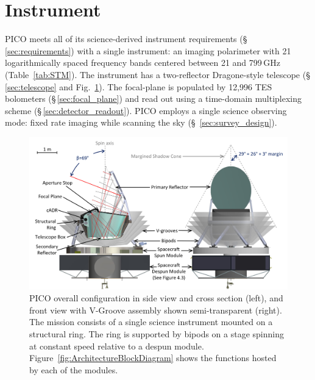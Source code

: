 \newcommand\pdeg{.\!\!\degree}
\newcommand\parcm{.\!\!'}

\section{Instrument}
\label{sec:instrument} %



PICO meets all of its science-derived instrument requirements (\S\,\ref{sec:requirements}) with a single instrument: an imaging polarimeter with 21 logarithmically spaced frequency bands centered between 21 and 799\,GHz (Table~\ref{tab:STM}). The instrument has a two-reflector Dragone-style telescope (\S\,\ref{sec:telescope} and Fig.~\ref{fig:InstrumentCAD}). The focal-plane is populated by 12,996 \ac{TES} bolometers (\S\,\ref{sec:focal_plane}) and read out using a time-domain multiplexing scheme (\S\,\ref{sec:detector_readout}). PICO employs a single science observing mode: fixed rate imaging while scanning the sky (\S~\ref{sec:survey_design}). 
\begin{figure}[h] 
\hspace{-0.1in}
\parbox{5.1in}{\centerline{
\includegraphics[width=5.25in]{figures/InstrumentCAD.png} }}
\hspace{0.05in}
\parbox{1.3in}{
\caption{\captiontext
PICO overall configuration in side view and cross section (left), and front view with V-Groove assembly shown semi-transparent (right).  The mission consists of a single science instrument mounted on a structural ring. The ring is supported by bipods on a stage spinning at constant speed relative to a despun module. Figure~\ref{fig:ArchitectureBlockDiagram} shows the functions hosted by each of the modules. 
\label{fig:InstrumentCAD}} }
\vspace{-0.1in}
\end{figure}

